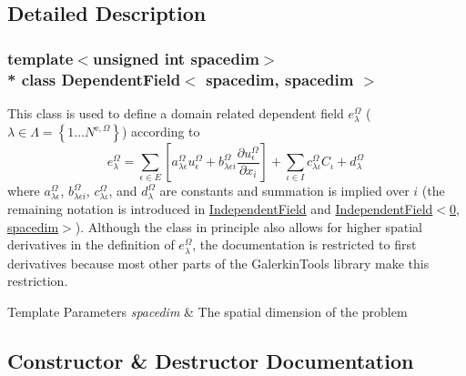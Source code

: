 \subsection{Detailed Description}
\subsubsection*{template$<$unsigned int spacedim$>$\\*
class Dependent\+Field$<$ spacedim, spacedim $>$}

This class is used to define a domain related dependent field $e^\Omega_\lambda$ ( $\lambda \in \Lambda=\left\{1 \hdots N^{\mathrm{e},\Omega}\right\}$) according to \begin{equation*} e^\Omega_\lambda = \sum_{\epsilon \in E} \left[ a^\Omega_{\lambda\epsilon} u^\Omega_\epsilon + b^\Omega_{\lambda \epsilon i} \dfrac{\partial u^\Omega_\epsilon}{\partial x_i} \right] + \sum_{\iota \in I}c^\Omega_{\lambda\iota} C_\iota + d^\Omega_\lambda\, \end{equation*} where $a^\Omega_{\lambda\epsilon}$, $b^\Omega_{\lambda \epsilon i}$, $c^\Omega_{\lambda\iota}$, and $d^\Omega_\lambda$ are constants and summation is implied over $i$ (the remaining notation is introduced in \hyperlink{class_independent_field}{Independent\+Field} and \hyperlink{class_independent_field_3_010_00_01spacedim_01_4}{Independent\+Field$<$0, spacedim$>$}). Although the class in principle also allows for higher spatial derivatives in the definition of $e^\Omega_\lambda$, the documentation is restricted to first derivatives because most other parts of the Galerkin\+Tools library make this restriction.


\begin{DoxyTemplParams}{Template Parameters}
{\em spacedim} & The spatial dimension of the problem \\
\hline
\end{DoxyTemplParams}


\subsection{Constructor \& Destructor Documentation}
